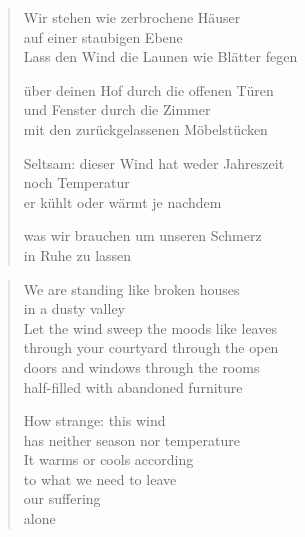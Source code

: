 
\cleartoverso


\begin{verse}

Wir stehen wie zerbrochene Häuser\\
auf einer staubigen Ebene\\
Lass den Wind die Launen wie Blätter fegen

über deinen Hof durch die offenen Türen\\
und Fenster durch die Zimmer\\
mit den zurückgelassenen Möbelstücken

Seltsam: dieser Wind hat weder Jahreszeit\\
noch Temperatur\\
er kühlt oder wärmt je nachdem

was wir brauchen um unseren Schmerz\\
in Ruhe zu lassen

\end{verse}

\clearpage


\begin{verse}

We are standing like broken houses\\
in a dusty valley\\
Let the wind sweep the moods like leaves\\
through your courtyard through the open\\
doors and windows through the rooms\\
half-filled with abandoned furniture

How strange: this wind\\
has neither season nor temperature\\
It warms or cools according\\
to what we need to leave\\
our suffering\\
alone

\end{verse}
